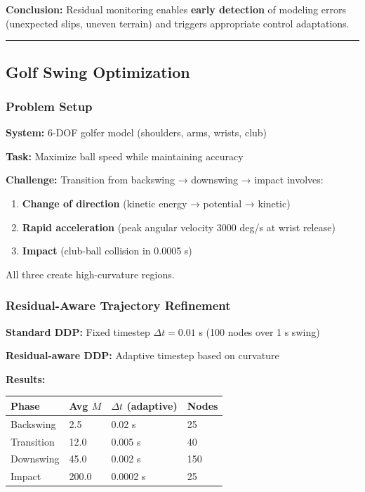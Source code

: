 \documentclass[
  letterpaper,
  DIV=11,
  numbers=noendperiod]{scrartcl}
\providecommand{\tightlist}{%
  \setlength{\itemsep}{0pt}\setlength{\parskip}{0pt}}\usepackage{longtable,booktabs,array}
\begin{document}
\textbf{Conclusion:} Residual monitoring enables \textbf{early
detection} of modeling errors (unexpected slips, uneven terrain) and
triggers appropriate control adaptations.

\begin{center}\rule{0.5\linewidth}{0.5pt}\end{center}

\subsection{Golf Swing Optimization}\label{sec-golf}

\subsubsection{Problem Setup}\label{problem-setup-2}

\textbf{System:} 6-DOF golfer model (shoulders, arms, wrists, club)

\textbf{Task:} Maximize ball speed while maintaining accuracy

\textbf{Challenge:} Transition from backswing → downswing → impact
involves:

\begin{enumerate}
\def\labelenumi{\arabic{enumi}.}
\tightlist
\item
  \textbf{Change of direction} (kinetic energy → potential → kinetic)
\item
  \textbf{Rapid acceleration} (peak angular velocity 3000 deg/s at wrist
  release)
\item
  \textbf{Impact} (club-ball collision in 0.0005 s)
\end{enumerate}

All three create high-curvature regions.

\subsubsection{Residual-Aware Trajectory
Refinement}\label{residual-aware-trajectory-refinement}

\textbf{Standard DDP:} Fixed timestep \(\Delta t = 0.01\) s (100 nodes
over 1 s swing)

\textbf{Residual-aware DDP:} Adaptive timestep based on curvature

\textbf{Results:}

\begin{longtable}[]{@{}llll@{}}
\toprule\noalign{}
Phase & Avg \(M\) & \(\Delta t\) (adaptive) & Nodes \\
\midrule\noalign{}
\endhead
\bottomrule\noalign{}
\endlastfoot
Backswing & 2.5 & 0.02 s & 25 \\
Transition & 12.0 & 0.005 s & 40 \\
Downswing & 45.0 & 0.002 s & 150 \\
Impact & 200.0 & 0.0002 s & 25 \\
\end{longtable}
\end{document}

